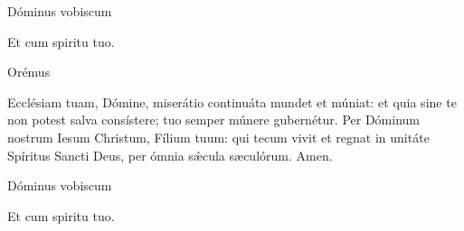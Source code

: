 


\rubric{\Vbar} Dóminus vobiscum

\rubric{\Rbar} Et cum spiritu tuo.

Orémus

Ecclésiam tuam, Dómine, miserátio continuáta mundet et múniat: et quia sine te non potest salva consístere; tuo semper múnere gubernétur.
Per Dóminum nostrum Iesum Christum, Fílium tuum: qui tecum vivit et regnat in unitáte Spíritus Sancti Deus, per ómnia sǽcula sæculórum.\rubric{\Rbar} Amen.

\rubric{\Vbar} Dóminus vobiscum

\rubric{\Rbar} Et cum spiritu tuo.
